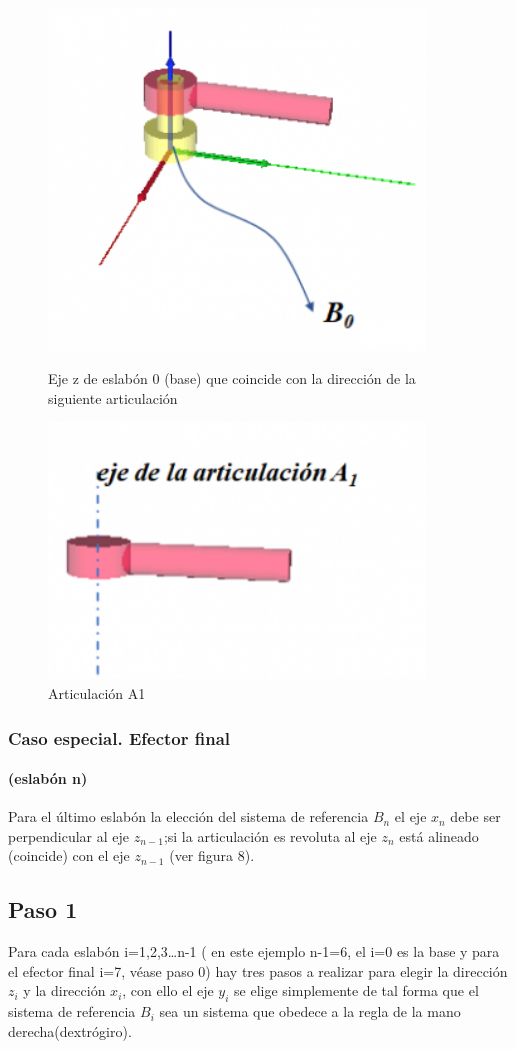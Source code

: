 \documentclass[12pt,a4paper]{report}
\begin{document}
\begin{figure}[hbtp]
\centering
\includegraphics[width=10cm]{2.png}
\caption{Eje z de eslabón 0 (base) que coincide con la dirección de la siguiente articulación}
\includegraphics[width=10cm]{3.png}
\caption{Articulación A1}
\end{figure}

\subsubsection{Caso especial. Efector final}
\paragraph{(eslabón n)}
Para el último eslabón la elección del sistema de referencia $B_{n}$ el eje $x_{n}$ debe ser perpendicular al eje $z_{n-1}$;si la articulación es revoluta al eje $z_{n}$ está alineado (coincide) con el eje $z_{n-1}$ (ver figura 8).
\subsection{Paso 1}
Para cada eslabón  i=1,2,3…n-1 ( en este ejemplo n-1=6, el i=0 es la base y para el efector final i=7, véase paso 0)  hay tres pasos a realizar para elegir la dirección $z_{i}$ y la dirección $x_{i}$, con ello el eje $y_{i}$ se elige simplemente de tal forma que el sistema de referencia $B_{i}$ sea un sistema que obedece a la regla de la mano derecha(dextrógiro).
\end{document}
